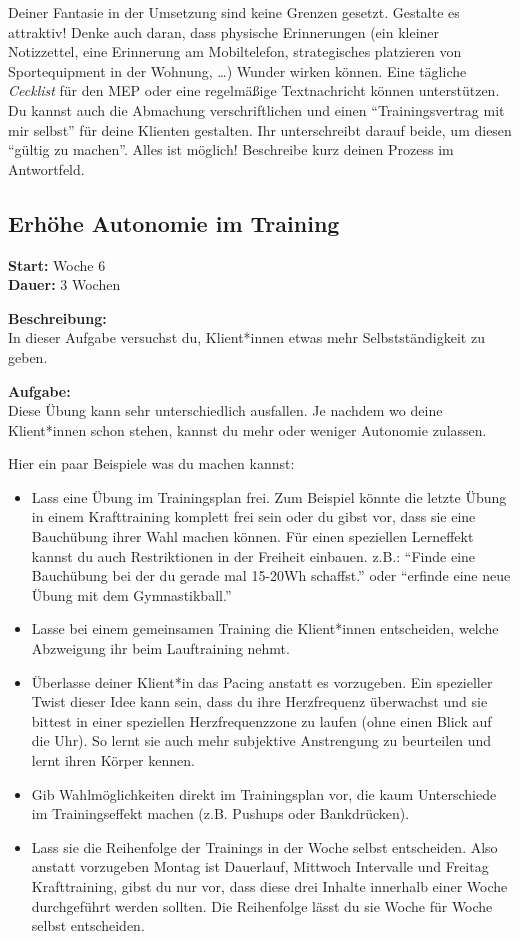 \documentclass[
  letterpaper,
  DIV=11,
  numbers=noendperiod]{scrreprt}
\begin{document}
Deiner Fantasie in der Umsetzung sind keine Grenzen gesetzt. Gestalte es
attraktiv! Denke auch daran, dass physische Erinnerungen (ein kleiner
Notizzettel, eine Erinnerung am Mobiltelefon, strategisches platzieren
von Sportequipment in der Wohnung, \ldots) Wunder wirken können. Eine
tägliche \emph{Cecklist} für den MEP oder eine regelmäßige Textnachricht
können unterstützen. Du kannst auch die Abmachung verschriftlichen und
einen ``Trainingsvertrag mit mir selbst'' für deine Klienten gestalten.
Ihr unterschreibt darauf beide, um diesen ``gültig zu machen''. Alles
ist möglich! Beschreibe kurz deinen Prozess im Antwortfeld.

\subsection{Erhöhe Autonomie im
Training}\label{erhuxf6he-autonomie-im-training}

\textbf{Start:} Woche 6\\
\textbf{Dauer:} 3 Wochen

\textbf{Beschreibung:}\\
In dieser Aufgabe versuchst du, Klient*innen etwas mehr
Selbstständigkeit zu geben.

\textbf{Aufgabe:}\\
Diese Übung kann sehr unterschiedlich ausfallen. Je nachdem wo deine
Klient*innen schon stehen, kannst du mehr oder weniger Autonomie
zulassen.

Hier ein paar Beispiele was du machen kannst:

\begin{itemize}
\item
  Lass eine Übung im Trainingsplan frei. Zum Beispiel könnte die letzte
  Übung in einem Krafttraining komplett frei sein oder du gibst vor,
  dass sie eine Bauchübung ihrer Wahl machen können. Für einen
  speziellen Lerneffekt kannst du auch Restriktionen in der Freiheit
  einbauen. z.B.: ``Finde eine Bauchübung bei der du gerade mal 15-20Wh
  schaffst.'' oder ``erfinde eine neue Übung mit dem Gymnastikball.''
\item
  Lasse bei einem gemeinsamen Training die Klient*innen entscheiden,
  welche Abzweigung ihr beim Lauftraining nehmt.
\item
  Überlasse deiner Klient*in das Pacing anstatt es vorzugeben. Ein
  spezieller Twist dieser Idee kann sein, dass du ihre Herzfrequenz
  überwachst und sie bittest in einer speziellen Herzfrequenzzone zu
  laufen (ohne einen Blick auf die Uhr). So lernt sie auch mehr
  subjektive Anstrengung zu beurteilen und lernt ihren Körper kennen.
\item
  Gib Wahlmöglichkeiten direkt im Trainingsplan vor, die kaum
  Unterschiede im Trainingseffekt machen (z.B. Pushups oder
  Bankdrücken).
\item
  Lass sie die Reihenfolge der Trainings in der Woche selbst
  entscheiden. Also anstatt vorzugeben Montag ist Dauerlauf, Mittwoch
  Intervalle und Freitag Krafttraining, gibst du nur vor, dass diese
  drei Inhalte innerhalb einer Woche durchgeführt werden sollten. Die
  Reihenfolge lässt du sie Woche für Woche selbst entscheiden.
\end{itemize}
\end{document}
